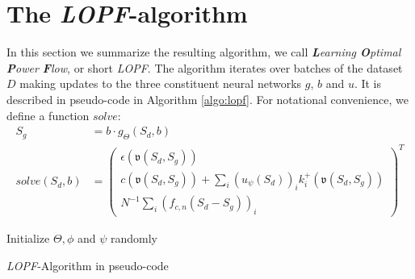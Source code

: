 \section{The \emph{LOPF}-algorithm}
\label{sec:LOPFalgo}
In this section we summarize the resulting algorithm, we call \emph{\textbf{L}earning \textbf{O}ptimal \textbf{P}ower \textbf{F}low}, or short \emph{LOPF}. The algorithm iterates over batches of the dataset $D$ making updates to the three constituent neural networks $g$, $b$ and $u$. It is described in pseudo-code in Algorithm \ref{algo:lopf}. For notational convenience, we define a function $solve$:
\begin{align*}
S_g &= b \cdot g_\Theta(S_d, b)\\
solve(S_d,b)
&=
\begin{pmatrix}
\epsilon(\mathfrak{v}(S_d,S_g)) \\
 c(\mathfrak{v}(S_d,S_g)) + \sum_i (u_\psi(S_d))_i k^+_i(\mathfrak{v}(S_d,S_g)) \\
N^{-1}\sum_i (f_{c,n}(S_d - S_g))_i
\end{pmatrix}^T
\end{align*}



\begin{algorithm}[htb]
Initialize $\Theta, \phi$ and $\psi$ randomly\;
\caption{\emph{LOPF}-Algorithm in pseudo-code}
\label{algo:lopf}
\end{algorithm}

